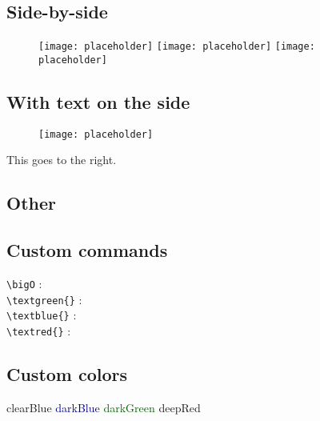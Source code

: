 \documentclass{customSynthesis}
\begin{document}
\subsection*{Side-by-side}

\begin{figure}[H]
    \centering
    \texttt{[image: placeholder]}\hfill
	\texttt{[image: placeholder]}\hfill
	\texttt{[image: placeholder]}
\end{figure}

\subsection*{With text on the side}

\begin{minipage}{0.5\textwidth}
	\begin{figure}[H]
		\centering
		\texttt{[image: placeholder]}
	\end{figure}
\end{minipage}
\begin{minipage}{0.5\textwidth}
	This goes to the right.
\end{minipage}

\subsection*{Other}

\subsection*{Custom commands}

\verb|\bigO| : \bigO\\
\verb|\textgreen{}| : \\
\verb|\textblue{}| : \\
\verb|\textred{}| : 

\subsection*{Custom colors}

\textcolor{clearBlue}{clearBlue}
\textcolor{darkBlue}{darkBlue}
\textcolor{darkGreen}{darkGreen}
\textcolor{deepRed}{deepRed}
\end{document}
